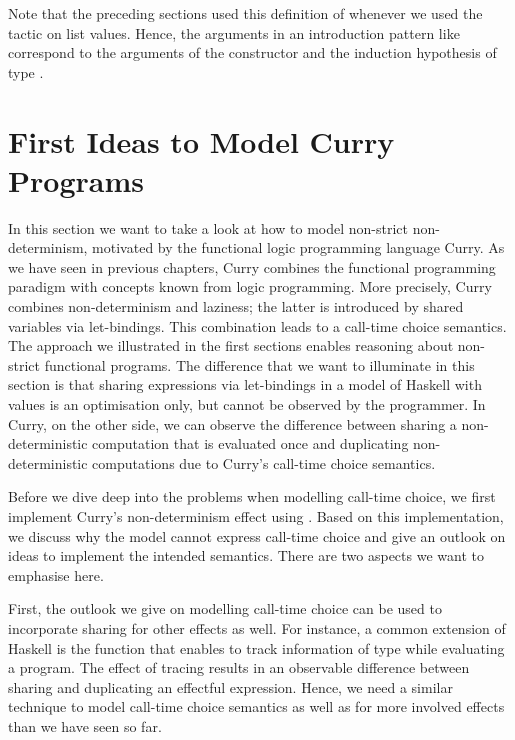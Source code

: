 Note that the preceding sections used this definition of  whenever we used the tactic  on list
values.
Hence, the arguments in an introduction pattern like \cinl{[ | fy fys IH ]} correspond to the arguments of the  constructor and the induction hypothesis of type .

\section{First Ideas to Model Curry Programs}

In this section we want to take a look at how to model non\--strict non\--determinism, motivated by the functional logic programming language Curry.
As we have seen in previous chapters, Curry combines the functional programming paradigm with concepts known from logic programming.
More precisely, Curry combines non\--determinism and laziness; the latter is introduced by shared variables via let\--bindings.
This combination leads to a call\--time choice semantics.
The approach we illustrated in the first sections enables reasoning about non\--strict functional programs.
The difference that we want to illuminate in this section is that sharing expressions via let\--bindings in a model of Haskell with  values is an optimisation only, but cannot be observed by the programmer.
In Curry, on the other side, we can observe the difference between sharing a non\--deterministic computation that is evaluated once and duplicating non\--deterministic computations due to Curry's call\--time choice semantics.

Before we dive deep into the problems when modelling call\--time choice, we first implement Curry's non\--determinism effect using .
Based on this implementation, we discuss why the model cannot express call\--time choice and give an outlook on ideas to implement the intended semantics.
There are two aspects we want to emphasise here.

First, the outlook we give on modelling call\--time choice can be used to incorporate sharing for other effects as well.
For instance, a common extension of Haskell is the function  that enables to track information of type  while evaluating a program.
The effect of tracing results in an observable difference between sharing and duplicating an effectful expression.
Hence, we need a similar technique to model call\--time choice semantics as well as for more involved effects than we have seen so far.

